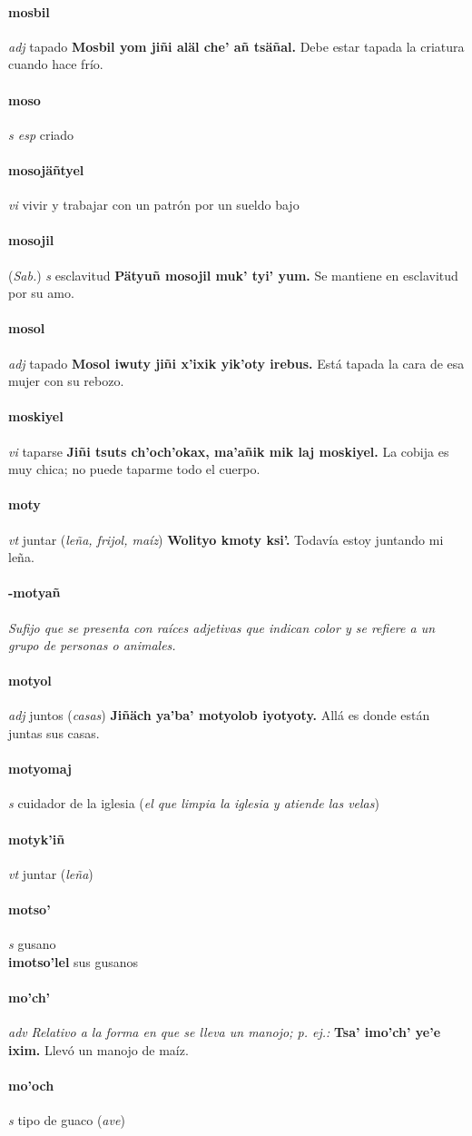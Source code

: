 \documentclass{scrbook}
\newcommand{\entry}[1]{\paragraph{#1}}
\newcommand{\nontranslationdef}[1]{\textit{#1}}
\newcommand{\partofspeech}[1]{\textit{#1}}
\newcommand{\spanishtranslation}[1]{#1}
\newcommand{\clarification}[1]{(\textit{#1})}
\newcommand{\cholexample}[1]{\textbf{#1}}
\newcommand{\exampletranslation}[1]{#1}
\newcommand{\relevantdialect}[1]{(\textit{#1})}
\newcommand{\secondaryentry}[1]{\\\textbf{#1}}
\newcommand{\secondtranslation}[1]{#1}
\begin{document}
\begin{multicols}{2}
\entry{mosbil}
\partofspeech{adj}
\spanishtranslation{tapado}
\cholexample{Mosbil yom jiñi aläl che' añ tsäñal.}
\exampletranslation{Debe estar tapada la criatura cuando hace frío.}

\entry{moso}
\partofspeech{s esp}
\spanishtranslation{criado}

\entry{mosojäñtyel}
\partofspeech{vi}
\spanishtranslation{vivir y trabajar con un patrón por un sueldo bajo}

\entry{mosojil}
\relevantdialect{Sab.}
\partofspeech{s}
\spanishtranslation{esclavitud}
\cholexample{Pätyuñ mosojil muk' tyi' yum.}
\exampletranslation{Se mantiene en esclavitud por su amo.}

\entry{mosol}
\partofspeech{adj}
\spanishtranslation{tapado}
\cholexample{Mosol iwuty jiñi x'ixik yik'oty irebus.}
\exampletranslation{Está tapada la cara de esa mujer con su rebozo.}

\entry{moskiyel}
\partofspeech{vi}
\spanishtranslation{taparse}
\cholexample{Jiñi tsuts ch'och'okax, ma'añik mik laj moskiyel.}
\exampletranslation{La cobija es muy chica; no puede taparme todo el cuerpo.}

\entry{moty}
\partofspeech{vt}
\spanishtranslation{juntar}
\clarification{leña, frijol, maíz}
\cholexample{Wolityo kmoty ksi'.}
\exampletranslation{Todavía estoy juntando mi leña.}

\entry{-motyañ}
\nontranslationdef{Sufijo que se presenta con raíces adjetivas que indican color y se refiere a un grupo de personas o animales.}

\entry{motyol}
\partofspeech{adj}
\spanishtranslation{juntos}
\clarification{casas}
\cholexample{Jiñäch ya'ba' motyolob iyotyoty.}
\exampletranslation{Allá es donde están juntas sus casas.}

\entry{motyomaj}
\partofspeech{s}
\spanishtranslation{cuidador de la iglesia}
\clarification{el que limpia la iglesia y atiende las velas}

\entry{motyk'iñ}
\partofspeech{vt}
\spanishtranslation{juntar}
\clarification{leña}

\entry{motso'}
\partofspeech{s}
\spanishtranslation{gusano}
\secondaryentry{imotso'lel}
\secondtranslation{sus gusanos}

\entry{mo'ch'}
\partofspeech{adv}
\nontranslationdef{Relativo a la forma en que se lleva un manojo; p. ej.:}
\cholexample{Tsa' imo'ch' ye'e ixim.}
\exampletranslation{Llevó un manojo de maíz.}

\entry{mo'och}
\partofspeech{s}
\spanishtranslation{tipo de guaco}
\clarification{ave}


\end{multicols}
\end{document}
